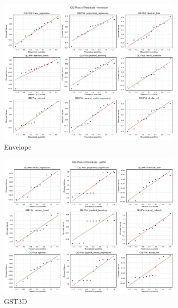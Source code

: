 \begin{figure}[htbp]
    \centering
    \begin{subfigure}[t]{0.32\textwidth}
        \includegraphics[width=\textwidth]{assets/images/05/residual_qq_plots_envelope}
        \caption{Envelope}
    \end{subfigure}
    \hfill
    \begin{subfigure}[t]{0.32\textwidth}
        \includegraphics[width=\textwidth]{assets/images/05/residual_qq_plots_gst3d}
        \caption{\ac{GST3D}}
    \end{subfigure}
    \hfill
    \begin{subfigure}[t]{0.32\textwidth}

\end{subfigure}
\end{figure}
